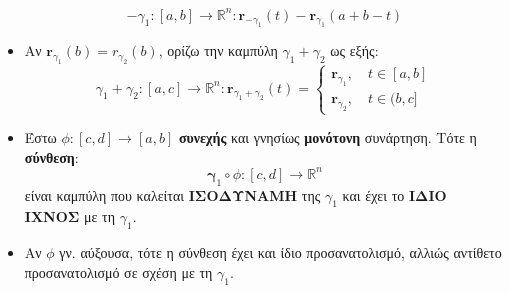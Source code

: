 \documentclass[11pt,a4paper,titlepage]{article}
\begin{document}
\begin{itemize}
\[ -{\gamma_1} : [a,b] \rightarrow \mathbb R^n : \mathbf r_{-\gamma_1}(t) - \mathbf r_{\gamma_1}(a+b-t)
\]

\item Αν \(\mathbf r_{\gamma_1}(b) = r_{\gamma_2}(b)\), ορίζω την καμπύλη \( \gamma_1+\gamma_2 \) ως εξής:
\[
\gamma_1+\gamma_2: [a,c] \rightarrow \mathbb R^n:
\mathbf r_{\gamma_1+\gamma_2}(t) =
\begin{cases}
\mathbf r_{\gamma_1}, \quad t \in [a,b] \\
\mathbf r_{\gamma_2}, \quad t \in (b, c]
\end{cases}
\]

\item Έστω \( \phi: [c,d] \rightarrow [a,b] \) \textbf{συνεχής} και γνησίως \textbf{μονότονη} συνάρτηση. Τότε η \textbf{σύνθεση}: \[ \mathbf \gamma_1 \circ \phi: [c, d] \rightarrow \mathbb R ^n \]
είναι καμπύλη που καλείται \textbf{ΙΣΟΔΥΝΑΜΗ} της \(\gamma_1\) και έχει το \textbf{ΙΔΙΟ ΙΧΝΟΣ} με τη \(\gamma_1\).

\item Αν \(\phi\) γν. αύξουσα, τότε η σύνθεση έχει και ίδιο προσανατολισμό, αλλιώς αντίθετο προσανατολισμό σε σχέση με τη \(\gamma_1\).
\end{itemize}
\end{document}

